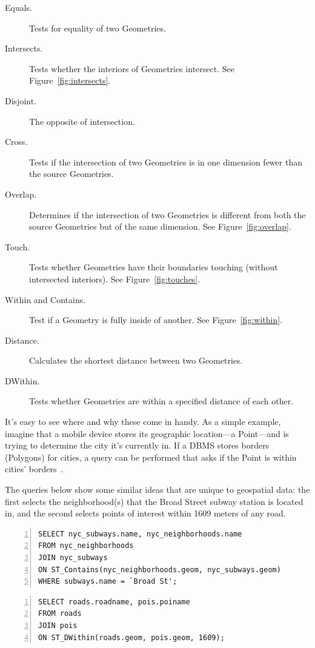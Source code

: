 \begin{description}
  \item[Equals.] Tests for equality of two Geometries.
  \item[Intersects.] Tests whether the interiors of Geometries intersect. See Figure~\ref{fig:intersects}.
  \item[Disjoint.] The opposite of intersection.
  \item[Cross.] Tests if the intersection of two Geometries is in one dimension fewer than the source Geometries.
  \item[Overlap.] Determines if the intersection of two Geometries is different from both the source Geometries but of the same dimension. See Figure~\ref{fig:overlap}.
  \item[Touch.] Tests whether Geometries have their boundaries touching (without intersected interiors). See Figure~\ref{fig:touches}.
  \item[Within and Contains.] Test if a Geometry is fully inside of another. See Figure~\ref{fig:within}.
  \item[Distance.] Calculates the shortest distance between two Geometries.
  \item[DWithin.] Tests whether Geometries are within a specified distance of each other.
\end{description}

It's easy to see where and why these come in handy. As a simple example, imagine that a mobile device stores its geographic location---a Point---and is trying to determine the city it's currently in. If a DBMS stores borders (Polygons) for cities, a query can be performed that asks if the Point is within cities' borders~\cite{Boundless}.

The queries below show some similar ideas that are unique to geospatial data: the first selects the neighborhood(s) that the Broad Street subway station is located in, and the second selects points of interest within 1609 meters of any road.

\begin{Verbatim}[samepage=true,baselinestretch=1,numbers=left,xleftmargin=12mm]
SELECT nyc_subways.name, nyc_neighborhoods.name
FROM nyc_neighborhoods
JOIN nyc_subways
ON ST_Contains(nyc_neighborhoods.geom, nyc_subways.geom)
WHERE subways.name = `Broad St';
\end{Verbatim}

\begin{Verbatim}[samepage=true,baselinestretch=1,numbers=left,xleftmargin=12mm]
SELECT roads.roadname, pois.poiname
FROM roads
JOIN pois 
ON ST_DWithin(roads.geom, pois.geom, 1609);
\end{Verbatim}

